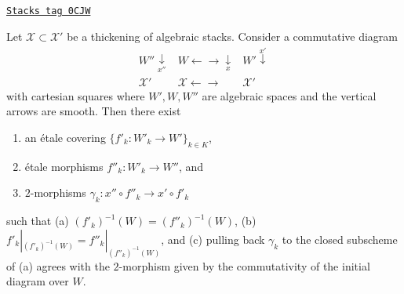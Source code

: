\begin{lemma}
\label{stacks-more-morphisms-lemma-etale-local-lifts-isomorphic}
\href{https://stacks.math.columbia.edu/tag/0CJW}{\texttt{Stacks tag 0CJW}}

Let $\mathcal{X} \subset \mathcal{X}'$ be a thickening of algebraic stacks.
Consider a commutative diagram
$$
\begin{array}{ccc}W'' \underset{x''}{\downarrow} & W \longleftarrow\longrightarrow\underset{x}{\downarrow} & W' \overset{x'}{\downarrow} \\ \mathcal{X}' & \mathcal{X} \longleftarrow\longrightarrow & \mathcal{X}'\end{array}
$$
with cartesian squares where $W', W, W''$ are algebraic spaces and
the vertical arrows are smooth. Then there exist
\begin{enumerate}
\item an \'etale covering $\{f'_k : W'_k \to W'\}_{k \in K}$,
\item \'etale morphisms $f''_k : W'_k \to W''$, and
\item $2$-morphisms $\gamma_k : x'' \circ f''_k \to x' \circ f'_k$
\end{enumerate}
such that (a) $(f'_k)^{-1}(W) = (f''_k)^{-1}(W)$, (b)
$f'_k|_{(f'_k)^{-1}(W)} = f''_k|_{(f''_k)^{-1}(W)}$, and
(c) pulling back $\gamma_k$ to the closed subscheme of (a)
agrees with the $2$-morphism given by the commutativity of
the initial diagram over $W$.
\end{lemma}

